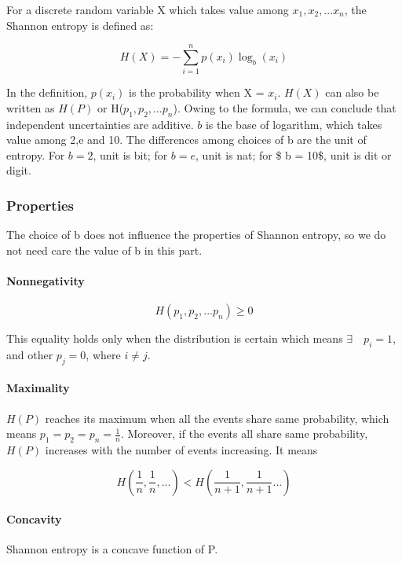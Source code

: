 \documentclass[
]{article}
\begin{document}
For a discrete random variable X which takes value among
\(x_1,x_2,...x_n\), the Shannon entropy is defined as:

\[H(X)=-\sum_{i=1}^np(x_i)\log_b(x_i)\]

In the definition, \(p(x_i)\) is the probability when X = \(x_i\).
\(H(X)\) can also be written as \(H(P)\) or H(\(p_1,p_2,...p_n\)). Owing
to the formula, we can conclude that independent uncertainties are
additive. \(b\) is the base of logarithm, which takes value among 2,e
and 10. The differences among choices of b are the unit of entropy. For
\(b=2\), unit is bit; for \(b = e\), unit is nat; for \$ b = 10\$, unit
is dit or digit.

\hypertarget{properties}{%
\subsubsection{Properties}\label{properties}}

The choice of b does not influence the properties of Shannon entropy, so
we do not need care the value of b in this part.

\hypertarget{nonnegativity}{%
\paragraph{Nonnegativity}\label{nonnegativity}}

\[H(p_1,p_2,...p_n)\ge0\]

This equality holds only when the distribution is certain which means
\(\exists\quad p_i=1\), and other \(p_j=0\), where \(i\neq j\).

\hypertarget{maximality}{%
\paragraph{Maximality}\label{maximality}}

\(H(P)\) reaches its maximum when all the events share same probability,
which means \(p_1=p_2=p_n=\frac{1}{n}\). Moreover, if the events all
share same probability, \(H(P)\) increases with the number of events
increasing. It means

\[H(\frac{1}{n},\frac{1}{n},...)<H(\frac{1}{n+1},\frac{1}{n+1}...)\]

\hypertarget{concavity}{%
\paragraph{Concavity}\label{concavity}}

Shannon entropy is a concave function of P.
\end{document}
